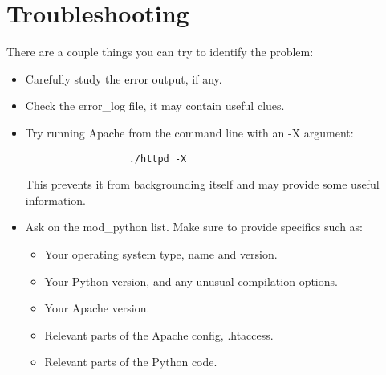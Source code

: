\section{Troubleshooting\label{inst-trouble}}

There are a couple things you can try to identify the problem: 

\begin{itemize}

\item Carefully study the error output, if any. 

\item Check the error_log file, it may contain useful clues. 

\item Try running Apache from the command line with an -X argument: 
\begin{verbatim}
                  ./httpd -X
\end{verbatim}
This prevents it from backgrounding itself and may provide some useful information. 

\item
Ask on the mod_python list. Make sure to provide specifics such as:

\begin{itemize}

\item Your operating system type, name and version.
\item Your Python version, and any unusual compilation options.
\item Your Apache version.
\item Relevant parts of the Apache config, .htaccess.
\item Relevant parts of the Python code.

\end{itemize}

\end{itemize}